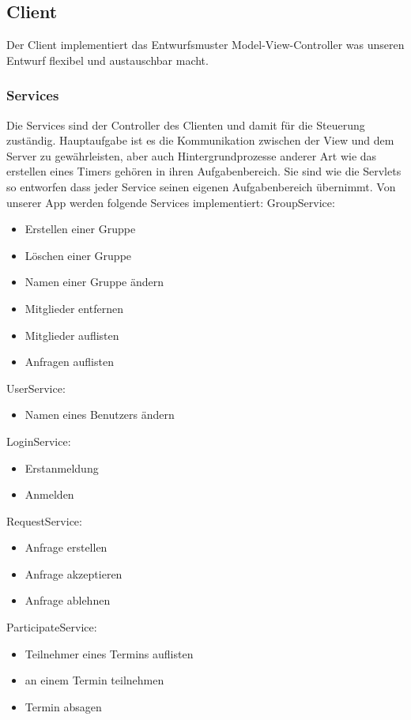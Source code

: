 	\subsection{Client}
	Der Client implementiert das Entwurfsmuster Model-View-Controller was unseren Entwurf flexibel und austauschbar macht.
	\subsubsection{Services}
	Die Services sind der Controller des Clienten und damit für die Steuerung zuständig. Hauptaufgabe ist es die Kommunikation zwischen der View und dem Server zu gewährleisten, aber auch Hintergrundprozesse anderer Art wie das erstellen eines Timers gehören in ihren Aufgabenbereich.
Sie sind wie die Servlets so entworfen dass jeder Service seinen eigenen Aufgabenbereich übernimmt.
Von unserer App werden folgende Services implementiert:
\newline
GroupService:
\begin{itemize}
\item Erstellen einer Gruppe
\item Löschen einer Gruppe
\item Namen einer Gruppe ändern
\item Mitglieder entfernen
\item Mitglieder auflisten
\item Anfragen auflisten
\end{itemize}
UserService:
\begin{itemize}
\item Namen eines Benutzers ändern
\end{itemize}
LoginService:
\begin{itemize}
\item Erstanmeldung
\item Anmelden
\end{itemize}
RequestService:
\begin{itemize}
\item Anfrage erstellen
\item Anfrage akzeptieren
\item Anfrage ablehnen
\end{itemize}
ParticipateService:
\begin{itemize}
\item Teilnehmer eines Termins auflisten
\item an einem Termin teilnehmen
\item Termin absagen
\end{itemize}
